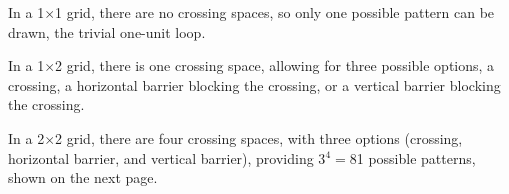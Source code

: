 
In a 1$\times$1 grid, there are no crossing spaces, so only one possible pattern can be drawn, the trivial one-unit loop.

\vspace{0.5cm}

\begin{center}

\end{center}

\vspace{0.5cm}


\noindent
In a 1$\times$2 grid, there is one crossing space, allowing for three possible options, a crossing, a horizontal barrier blocking the crossing, or a vertical barrier blocking the crossing.

\vspace{0.5cm}

\begin{center}
\hspace{0.5cm}
\hspace{0.5cm}

\end{center}

\vspace{0.5cm}

\noindent
In a 2$\times$2 grid, there are four crossing spaces, with three options (crossing, horizontal barrier, and vertical barrier), providing 3$^4=$81 possible patterns, shown on the next page.

\newpage


\noindent
\scalebox{0.6}{
\begin{minipage}{18cm}

\end{minipage}
}
